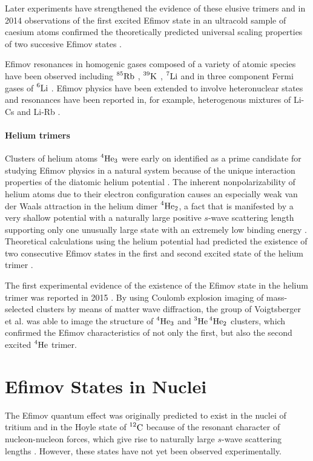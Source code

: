 Later experiments have strengthened the evidence of these elusive trimers and in 2014 observations of the first excited Efimov state in an ultracold sample of caesium atoms confirmed the theoretically predicted universal scaling properties of two succesive Efimov states \cite{Huang2014}.

Efimov resonances in homogenic gases composed of a variety of atomic species have been observed including $\prescript{85}{}{\mathrm{Rb}}$ \cite{Klauss2017}, $\prescript{39}{}{\mathrm{K}}$ \cite{Potassium}, $\prescript{7}{}{\mathrm{Li}}$ \cite{Lithium7} and in three component Fermi gases of $\prescript{6}{}{\mathrm{Li}}$ \cite{Williams2009}. Efimov physics have been extended to involve heteronuclear states and resonances have been reported in, for example, heterogenous mixtures of Li-Cs and Li-Rb \cite{LithiumRubidium,LithiumCeasium}.

\paragraph{Helium trimers}
Clusters of helium atoms $\prescript{4}{}{\mathrm{He}}_3$ were early on identified as a prime candidate for studying Efimov physics in a natural system because of the unique interaction properties of the diatomic helium potential \cite{Lim1977}. The inherent nonpolarizability of helium atoms due to their electron configuration causes an especially weak van der Waals attraction in the helium dimer $\prescript{4}{}{\mathrm{He}}_2$, a fact that is manifested by a very shallow potential with a naturally large positive $s$-wave scattering length supporting only one unusually large state with an extremely low binding energy \cite{Blume2019}. Theoretical calculations using the helium potential had predicted the existence of two consecutive Efimov states in the first and second excited state of the helium trimer \cite{Kamimura2012}.

The first experimental evidence of the existence of the Efimov state in the helium trimer was reported in 2015 \cite{Blume2015}. By using Coulomb explosion imaging of mass-selected clusters by means of matter wave diffraction, the group of Voigtsberger et al. was able to image the structure of $\prescript{4}{}{\mathrm{He}}_3$ and $\prescript{3}{}{\mathrm{He}}\prescript{4}{}{\mathrm{He}}_2$ clusters, which confirmed the Efimov characteristics of not only the first, but also the second excited $\prescript{4}{}{\mathrm{He}}$ trimer. 

\section{Efimov States in Nuclei }
The Efimov quantum effect was originally predicted to exist in the nuclei of tritium and in the Hoyle state of $\prescript{12}{}{\mathrm{C}}$ because of the resonant character of nucleon-nucleon forces, which give rise to naturally large $s$-wave scattering lengths \cite{Efimov:1970zz,Efimov:1971zz}. However, these states have not yet been observed experimentally. 

